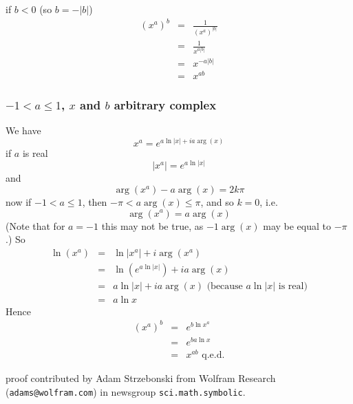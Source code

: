 \documentclass{article}
\begin{document}
if \(b<0\) (so \(b=-|b|\))
\begin{eqnarray}
(x^a)^b & = & \frac{1}{(x^a)^{|b|}}
\nonumber\\
& = & \frac{1}{x^{a|b|}}
\nonumber\\
& = & x^{-a|b|}
\nonumber\\
& = & x^{ab}
\end{eqnarray}

\subsubsection{\(-1 < a \le 1\), \(x\) and \(b\) arbitrary complex}

We have
\begin{equation}
x^a=e^{a \ln|x| + ia\arg(x)}
\end{equation}
if \(a\) is real
\begin{equation}
|x^a|=e^{a\ln|x|}
\end{equation}
and
\begin{equation}
\arg(x^a)-a\arg(x)=2k\pi
\end{equation}
now if \(-1 < a \le 1\), then \(-\pi < a\arg(x) \le \pi\),
and so \(k=0\), i.e.
\begin{equation}
\arg(x^a)=a\arg(x)
\end{equation}
(Note that for \(a=-1\) this may not be true, as \(-1 \arg(x)\) may be equal to \(-\pi\).)
So
\begin{eqnarray}
\ln(x^a) & = & \ln|x^a| + i\arg(x^a)
\nonumber\\
& = & \ln (e^{a\ln|x|})+ia\arg(x)
\nonumber\\
& = & a \ln |x| + ia\arg(x) \mbox{ (because \(a\ln|x|\) is real)}
\nonumber\\
& = & a\ln x
\end{eqnarray}
Hence
\begin{eqnarray}
(x^a)^b & = & e^{b\ln x^a}
\nonumber\\
& = & e^{ba\ln x}
\nonumber\\
& = & x^{ab} \mbox{ q.e.d.}
\end{eqnarray}

proof contributed by Adam Strzebonski from Wolfram Research
({\tt adams@wolfram.com}) in newsgroup {\tt sci.math.symbolic}.
\end{document}
